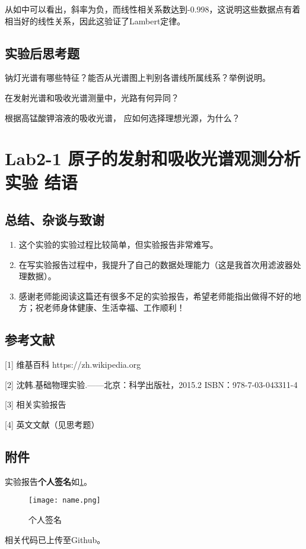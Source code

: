 \documentclass[dvipsnames, svgnames,a4paper,11pt]{article}
\begin{document}
	从如中可以看出，斜率为负，而线性相关系数达到-0.998，这说明这些数据点有着相当好的线性关系，因此这验证了Lambert定律。
	
	
	\subsection{实验后思考题}
	
	\begin{question}
		钠灯光谱有哪些特征？能否从光谱图上判别各谱线所属线系？举例说明。
	\end{question}
	
	\begin{question}
		在发射光谱和吸收光谱测量中，光路有何异同？
	\end{question}
	
	\begin{question}
		根据高锰酸钾溶液的吸收光谱， 应如何选择理想光源，为什么？
	\end{question}
	
	
	
	\clearpage
	
	\section{Lab2-1 原子的发射和吸收光谱观测分析实验 \quad\heiti 结语}
	
	\subsection{总结、杂谈与致谢}
	\begin{enumerate}
		\item 这个实验的实验过程比较简单，但实验报告非常难写。
		\item 在写实验报告过程中，我提升了自己的数据处理能力（这是我首次用滤波器处理数据）。
		\item 感谢老师能阅读这篇还有很多不足的实验报告，希望老师能指出做得不好的地方；祝老师身体健康、生活幸福、工作顺利！
	\end{enumerate}
	
	\subsection{参考文献}
	[1] 维基百科 https://zh.wikipedia.org
	
	[2] 沈韩.基础物理实验.——北京：科学出版社，2015.2 ISBN：978-7-03-043311-4
	
	[3] 相关实验报告
	
	[4] 英文文献（见思考题）
	
	
	\subsection{附件}
	
	实验报告\textbf{个人签名}如\cref{fig:name}。
	
	\begin{figure}[htbp]
		\centering
		\texttt{[image: name.png]}
		\caption{个人签名}
		\label{fig:name}
	\end{figure}
	
	
	相关代码已上传至Github。
	
	
	
\end{document}

